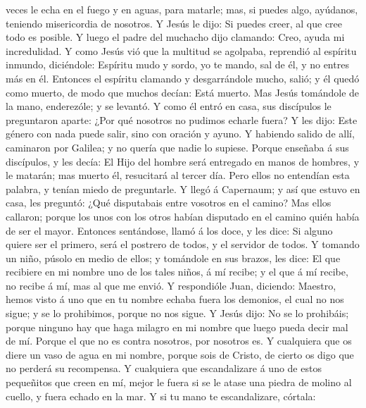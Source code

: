 veces le echa en el fuego y en aguas, para matarle; mas, si puedes algo,
ayúdanos, teniendo misericordia de nosotros.  Y Jesús le
dijo: Si puedes creer, al que cree todo es posible.  Y
luego el padre del muchacho dijo clamando: Creo, ayuda mi incredulidad.
 Y como Jesús vió que la multitud se agolpaba, reprendió al
espíritu inmundo, diciéndole: Espíritu mudo y sordo, yo te mando, sal de
él, y no entres más en él.  Entonces el espíritu clamando y
desgarrándole mucho, salió; y él quedó como muerto, de modo que muchos
decían: Está muerto.  Mas Jesús tomándole de la mano,
enderezóle; y se levantó.  Y como él entró en casa, sus
discípulos le preguntaron aparte: ¿Por qué nosotros no pudimos echarle
fuera?  Y les dijo: Este género con nada puede salir, sino
con oración y ayuno.  Y habiendo salido de allí, caminaron
por Galilea; y no quería que nadie lo supiese.  Porque
enseñaba á sus discípulos, y les decía: El Hijo del hombre será
entregado en manos de hombres, y le matarán; mas muerto él, resucitará
al tercer día.  Pero ellos no entendían esta palabra, y
tenían miedo de preguntarle.  Y llegó á Capernaum; y así
que estuvo en casa, les preguntó: ¿Qué disputabais entre vosotros en el
camino?  Mas ellos callaron; porque los unos con los otros
habían disputado en el camino quién había de ser el mayor. 
Entonces sentándose, llamó á los doce, y les dice: Si alguno quiere ser
el primero, será el postrero de todos, y el servidor de todos.
 Y tomando un niño, púsolo en medio de ellos; y tomándole
en sus brazos, les dice:  El que recibiere en mi nombre uno
de los tales niños, á mí recibe; y el que á mí recibe, no recibe á mí,
mas al que me envió.  Y respondióle Juan, diciendo:
Maestro, hemos visto á uno que en tu nombre echaba fuera los demonios,
el cual no nos sigue; y se lo prohibimos, porque no nos sigue.
 Y Jesús dijo: No se lo prohibáis; porque ninguno hay que
haga milagro en mi nombre que luego pueda decir mal de mí. 
Porque el que no es contra nosotros, por nosotros es.  Y
cualquiera que os diere un vaso de agua en mi nombre, porque sois de
Cristo, de cierto os digo que no perderá su recompensa.  Y
cualquiera que escandalizare á uno de estos pequeñitos que creen en mí,
mejor le fuera si se le atase una piedra de molino al cuello, y fuera
echado en la mar.  Y si tu mano te escandalizare, córtala:
